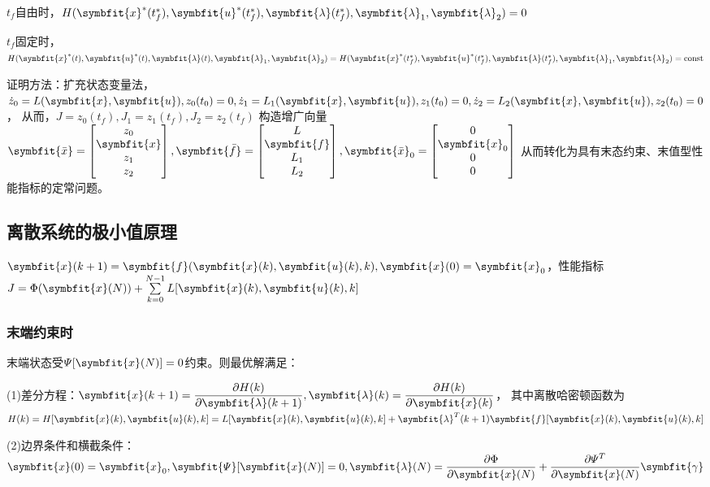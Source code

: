 \documentclass[11pt,a4paper]{ctexart}
\newcommand{\bm}{\symbfit}
\begin{document}
            $t_f$自由时，$H(\bm{x}^*(t_f^*),\bm{u}^*(t_f^*),\bm{\lambda}(t_f^*),\bm{\lambda}_1,\bm{\lambda}_2)=0$

            $t_f$固定时，$H(\bm{x}^*(t),\bm{u}^*(t),\bm{\lambda}(t),\bm{\lambda}_1,\bm{\lambda}_2)=H(\bm{x}^*(t_f^*),\bm{u}^*(t_f^*),\bm{\lambda}(t_f^*),\bm{\lambda}_1,\bm{\lambda}_2)={\rm const}$

            证明方法：扩充状态变量法，$\dot{z}_0=L(\bm{x},\bm{u}),z_0(t_0)=0,\dot{z}_1=L_1(\bm{x},\bm{u}),z_1(t_0)=0,\dot{z}_2=L_2(\bm{x},\bm{u}),z_2(t_0)=0$，
            从而，$J=z_0(t_f),J_1=z_1(t_f),J_2=z_2(t_f)$
            构造增广向量$\bm{\bar x}=\begin{bmatrix}z_0\\\bm{x}\\z_1\\z_2\end{bmatrix},\bm{\bar f}=\begin{bmatrix}L\\\bm{f}\\L_1\\L_2\end{bmatrix},\bm{\bar x}_0=\begin{bmatrix}0\\\bm{x}_0\\0\\0\end{bmatrix}$
            从而转化为具有末态约束、末值型性能指标的定常问题。
    \subsection{离散系统的极小值原理}
        $\bm{x}(k+1)=\bm{f}(\bm{x}(k),\bm{u}(k),k),\bm{x}(0)=\bm{x}_0$，性能指标$J=\Phi(\bm{x}(N))+\sum\limits_{k=0}^{N-1}L[\bm{x}(k),\bm{u}(k),k]$
        \subsubsection{末端约束时}
            末端状态受$\varPsi[\bm{x}(N)]=0$约束。则最优解满足：

            (1)差分方程：$\bm{x}(k+1)=\dfrac{\partial H(k)}{\partial\bm{\lambda}(k+1)},\bm{\lambda}(k)=\dfrac{\partial H(k)}{\partial\bm{x}(k)}$，
            其中离散哈密顿函数为$H(k)=H[\bm{x}(k),\bm{u}(k),k]=L[\bm{x}(k),\bm{u}(k),k]+\bm{\lambda}^T(k+1)\bm{f}[\bm{x}(k),\bm{u}(k),k]$
            
            (2)边界条件和横截条件：$\bm{x}(0)=\bm{x}_0,\bm{\varPsi}[\bm{x}(N)]=0,\bm{\lambda}(N)=\dfrac{\partial\Phi}{\partial\bm{x}(N)}+\dfrac{\partial\varPsi^T}{\partial\bm{x}(N)}\bm{\gamma}$
            
\end{document}

